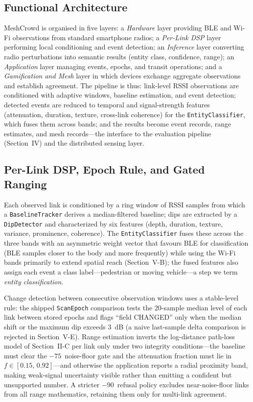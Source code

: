 \documentclass[journal,10pt]{IEEEtran}
\newcommand{\dBm}{\text{dBm}}
\begin{document}
\subsection{Functional Architecture}
MeshCrowd is organised in five layers: a
\emph{Hardware} layer providing BLE and Wi-Fi observations from standard
smartphone radios; a \emph{Per-Link DSP} layer performing local conditioning
and event detection; an \emph{Inference} layer converting radio perturbations
into semantic results (entity class, confidence, range); an \emph{Application}
layer managing events, epochs, and transit operations; and a
\emph{Gamification and Mesh} layer in which devices exchange aggregate
observations and establish agreement. The pipeline is thus: link-level RSSI
observations are conditioned with adaptive windows, baseline estimation, and
event detection; detected events are reduced to temporal and signal-strength
features (attenuation, duration, texture, cross-link coherence) for the
\texttt{EntityClassifier}, which fuses them across bands; and the results
become event records, range estimates, and mesh records---the interface to the
evaluation pipeline (Section~IV) and the distributed sensing layer.

\subsection{Per-Link DSP, Epoch Rule, and Gated Ranging}
\label{sec:dsp}
Each observed link is conditioned by a ring window of RSSI samples from
which a \texttt{BaselineTracker} derives a median-filtered baseline; dips are
extracted by a \texttt{DipDetector} and characterized by six features (depth,
duration, texture, variance, prominence, coherence). The
\texttt{EntityClassifier} fuses these across the three bands with an
asymmetric weight vector that favours BLE for classification (BLE samples
closer to the body and more frequently) while using the Wi-Fi bands primarily
to extend spatial reach (Section~V-B); the fused features also assign each
event a class label---pedestrian or moving vehicle---a step we term
\emph{entity classification}.

Change detection between consecutive observation windows uses a stable-level
rule: the shipped \texttt{ScanEpoch} comparison tests the 20-sample median
level of each link between stored epochs and flags ``field CHANGED'' only when
the median shift or the maximum dip exceeds 3~dB (a naive last-sample delta
comparison is rejected in Section~V-E). Range estimation inverts the
log-distance path-loss model of Section~II-C per link only under two
integrity conditions---the baseline must clear the $-75$\,\dBm{} noise-floor
gate and the attenuation fraction must lie in $f \in [0.15,\,0.92]$---and
otherwise the application reports a radial proximity band, making weak-signal
uncertainty visible rather than emitting a confident but unsupported number. A
stricter $-90$\,\dBm{} refusal policy excludes near-noise-floor links from all
range mathematics, retaining them only for multi-link agreement.
\end{document}
